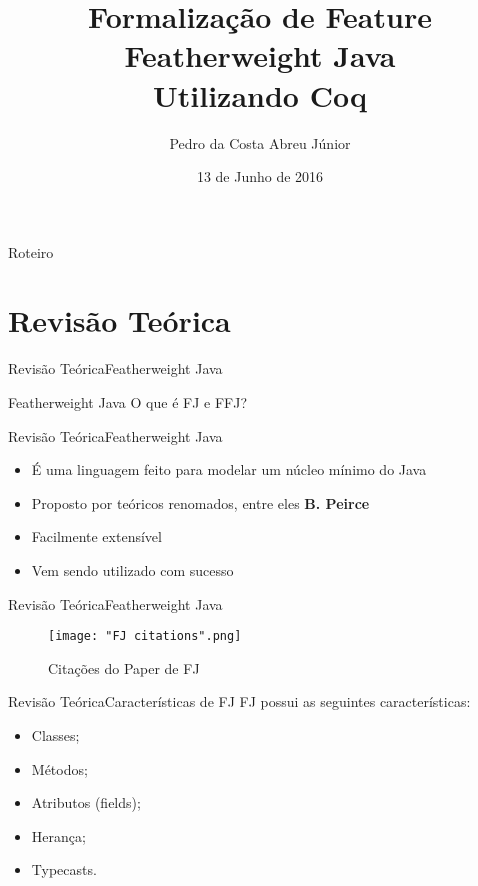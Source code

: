 \documentclass{beamer}
\title[Formalização de FFJ em Coq]{Formalização de Feature Featherweight Java \\ Utilizando Coq}
\author{Pedro da Costa Abreu Júnior}
\institute[UnB]
{
	Departamento de Ciência da Computação\\
	Universidade de Brasília 
}
\date{13 de Junho de 2016}
\begin{document}
	
	\begin{frame}
		\titlepage
	\end{frame}
	
	\begin{frame}{Roteiro}
		\tableofcontents
	\end{frame}
	\section{Revisão Teórica}
	\begin{frame}{Revisão Teórica}{Featherweight Java}
		\centering
		\begin{block}{Featherweight Java}
			O que é FJ e FFJ?
		\end{block}
	\end{frame}
	
	\begin{frame}{Revisão Teórica}{Featherweight Java}
		\centering
		\begin{itemize}
			\item {É uma linguagem feito para modelar um núcleo mínimo do Java}
			\item {Proposto por teóricos renomados, entre eles \textbf{B. Peirce}}
			\item Facilmente extensível
			\item Vem sendo utilizado com sucesso	
		\end{itemize}
	\end{frame}
	
	\begin{frame}{Revisão Teórica}{Featherweight Java}
		\centering
		\begin{figure}[h!]
			\texttt{[image: "FJ citations".png]}{}
			\caption[Quantidade de citações do Paper de FJ; This is the second line]
			{\tabular[t]{@{}l@{}}
				Citações do Paper de FJ \\ 
				\endtabular}
			
			\label{fig:fj-citations}
		\end{figure}
	\end{frame}
	
	\begin{frame}{Revisão Teórica}{Características de FJ}
		FJ possui as seguintes características:
		\begin{itemize}
			\item Classes;
			\item Métodos;
			\item Atributos (fields);
			\item Herança;
			\item Typecasts.
		\end{itemize}
	\end{frame}
	
\end{document}
